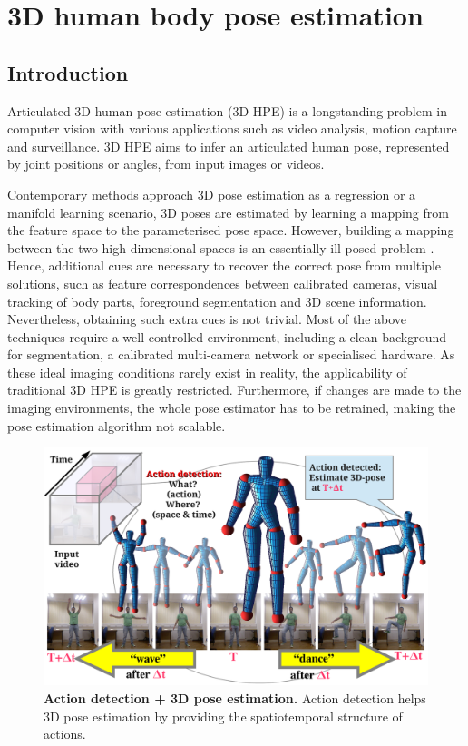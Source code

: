 \chapter{3D human body pose estimation}
\label{chap/body}

\section{Introduction}
\label{sec/body/intro}

Articulated 3D human pose estimation (3D HPE) is a longstanding problem in computer vision with various applications such as video analysis, motion capture and surveillance.
3D HPE aims to infer an articulated human pose, represented by joint positions or angles, from input images or videos. 

Contemporary methods approach 3D pose estimation as a regression or a manifold learning scenario, 3D poses are estimated by learning a mapping from the feature space to the parameterised pose space. However, building a mapping between the two high-dimensional spaces is an essentially ill-posed problem \cite{Elgammal2004}. Hence, additional cues are necessary to recover the correct pose from multiple solutions, such as feature correspondences between calibrated cameras, visual tracking of body parts, foreground segmentation and 3D scene information. 
Nevertheless, obtaining such extra cues is not trivial. 
Most of the above techniques require a well-controlled environment, including a clean background for segmentation, a calibrated multi-camera network or specialised hardware.   
As these ideal imaging conditions rarely exist in reality, the applicability of traditional 3D HPE is greatly restricted. 
Furthermore, if changes are made to the imaging environments, the whole pose estimator has to be retrained, making the pose estimation algorithm not scalable. 

\begin{figure}[th]
	\centering
	\includegraphics[width=1\linewidth]{fig/body/figure1_actionexplain.pdf} 
	\caption{\textbf{Action detection + 3D pose estimation.} Action detection helps 3D pose estimation by providing the spatiotemporal structure of actions.} 
	\label{fig/body/actionexplain}
\end{figure}

